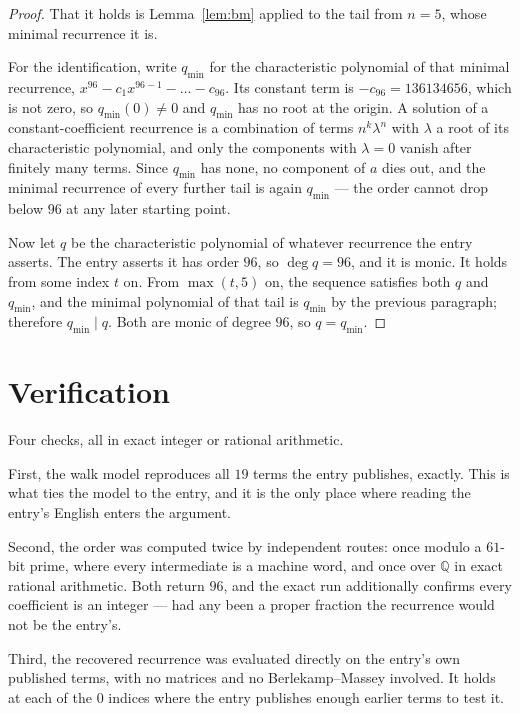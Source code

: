 \documentclass[11pt,a4paper]{article}
\theoremstyle{plain}
\theoremstyle{definition}
\begin{document}
\begin{proof}
That it holds is Lemma~\ref{lem:bm} applied to the tail from $n=5$, whose minimal
recurrence it is.

For the identification, write $q_{\min}$ for the characteristic polynomial of that minimal
recurrence, $x^{96}-c_1x^{96-1}-\dots-c_{96}$. Its constant term is
$-c_{96}=136134656$, which is not zero, so $q_{\min}(0)\neq0$ and $q_{\min}$ has no
root at the origin. A solution of a constant-coefficient recurrence is a combination of terms
$n^{k}\lambda^{n}$ with $\lambda$ a root of its characteristic polynomial, and only the
components with $\lambda=0$ vanish after finitely many terms. Since $q_{\min}$ has none, no
component of $a$ dies out, and the minimal recurrence of every further tail is again
$q_{\min}$ --- the order cannot drop below $96$ at any later starting point.

Now let $q$ be the characteristic polynomial of whatever recurrence the entry asserts. The
entry asserts it has order $96$, so $\deg q=96$, and it is monic. It holds from some
index $t$ on. From $\max(t,5)$ on, the sequence satisfies both $q$ and $q_{\min}$, and
the minimal polynomial of that tail is $q_{\min}$ by the previous paragraph; therefore
$q_{\min}\mid q$. Both are monic of degree $96$, so $q=q_{\min}$.
\end{proof}

\section{Verification}

Four checks, all in exact integer or rational arithmetic.

First, the walk model reproduces all $19$ terms the entry publishes, exactly. This is
what ties the model to the entry, and it is the only place where reading the entry's English
enters the argument.

Second, the order was computed twice by independent routes: once modulo a $61$-bit prime, where
every intermediate is a machine word, and once over $\mathbb{Q}$ in exact rational arithmetic.
Both return $96$, and the exact run additionally confirms every coefficient is an integer
--- had any been a proper fraction the recurrence would not be the entry's.

Third, the recovered recurrence was evaluated directly on the entry's own published terms, with
no matrices and no Berlekamp--Massey involved. It holds at each of the $0$ indices where
the entry publishes enough earlier terms to test it.
\end{document}
